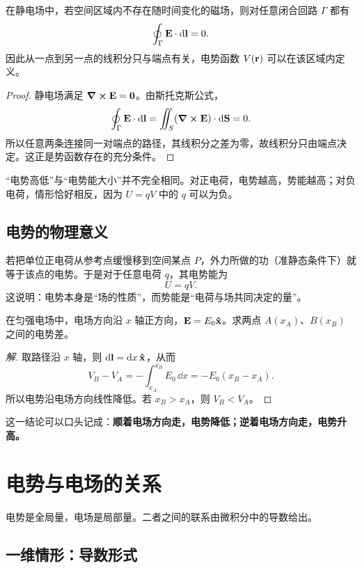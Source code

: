 \begin{theorem}
在静电场中，若空间区域内不存在随时间变化的磁场，则对任意闭合回路 $\Gamma$ 都有
\[
\oint_\Gamma \vb E\cdot \dd\vb l=0.
\]
因此从一点到另一点的线积分只与端点有关，电势函数 $V(\vb r)$ 可以在该区域内定义。
\end{theorem}

\begin{proof}
静电场满足 $\curl \vb E=\vb 0$。由斯托克斯公式，
\[
\oint_\Gamma \vb E\cdot \dd\vb l
=\iint_S (\curl \vb E)\cdot \dd\vb S=0.
\]
所以任意两条连接同一对端点的路径，其线积分之差为零，故线积分只由端点决定。这正是势函数存在的充分条件。
\end{proof}

\begin{remark}
“电势高低”与“电势能大小”并不完全相同。对正电荷，电势越高，势能越高；对负电荷，情形恰好相反，因为 $U=qV$ 中的 $q$ 可以为负。
\end{remark}

\subsection{电势的物理意义}

若把单位正电荷从参考点缓慢移到空间某点 $P$，外力所做的功（准静态条件下）就等于该点的电势。于是对于任意电荷 $q$，其电势能为
\[
U=qV.
\]
这说明：电势本身是“场的性质”，而势能是“电荷与场共同决定的量”。

\begin{example}
在匀强电场中，电场方向沿 $x$ 轴正方向，$\vb E=E_0\vu{x}$。求两点 $A(x_A)$、$B(x_B)$ 之间的电势差。
\end{example}

\begin{proof}[解]
取路径沿 $x$ 轴，则 $\dd\vb l=\dd x\,\vu{x}$，从而
\[
V_B-V_A=-\int_{x_A}^{x_B} E_0\,\dd x=-E_0(x_B-x_A).
\]
所以电势沿电场方向线性降低。若 $x_B>x_A$，则 $V_B<V_A$。
\end{proof}

这一结论可以口头记成：\textbf{顺着电场方向走，电势降低；逆着电场方向走，电势升高。}

\section{电势与电场的关系}

电势是全局量，电场是局部量。二者之间的联系由微积分中的导数给出。

\subsection{一维情形：导数形式}

